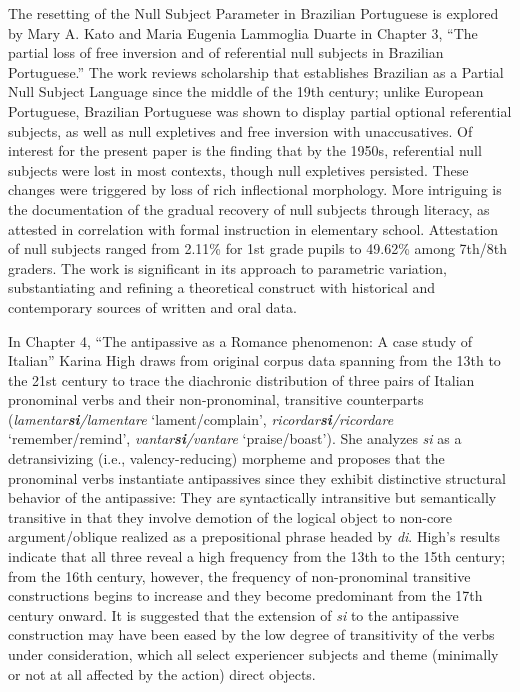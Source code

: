 \documentclass[output=paper,draftmode]{langscibook}
\begin{document}
The resetting of the Null Subject Parameter in Brazilian Portuguese is explored by Mary A. Kato and Maria Eugenia Lammoglia Duarte in Chapter 3, “The partial loss of free inversion and of referential null subjects in Brazilian Portuguese.” The work reviews scholarship that establishes Brazilian as a Partial Null Subject Language since the middle of the 19th century; unlike European Portuguese, Brazilian Portuguese was shown to display partial optional referential subjects, as well as null expletives and free inversion with unaccusatives. Of interest for the present paper is the finding that by the 1950s, referential null subjects were lost in most contexts, though null expletives persisted. These changes were triggered by loss of rich inflectional morphology. More intriguing is the documentation of the gradual recovery of null subjects through literacy, as attested in correlation with formal instruction in elementary school. Attestation of null subjects ranged from 2.11\% for 1st grade pupils to 49.62\% among 7th/8th graders. The work is significant in its approach to parametric variation, substantiating and refining a theoretical construct with historical and contemporary sources of written and oral data.

In Chapter 4, “The antipassive as a Romance phenomenon: A case study of Italian” Karina High draws from original corpus data spanning from the 13th to the 21st century to trace the diachronic distribution of three pairs of Italian pronominal verbs and their non-pronominal, transitive counterparts (\textit{lamentar\textbf{si}/lamentare} ‘lament/complain’, \textit{ricordar\textbf{si}/ricordare} ‘remember/remind’, \textit{vantar\textbf{si}/vantare} ‘praise/boast’). She analyzes \textit{si} as a detransivizing (i.e., valency-reducing) morpheme and proposes that the pronominal verbs instantiate antipassives since they exhibit distinctive structural behavior of the antipassive: They are syntactically intransitive but semantically transitive in that they involve demotion of the logical object to non-core argument/oblique realized as a prepositional phrase headed by \textit{di}. High’s results indicate that all three reveal a high frequency from the 13th to the 15th century; from the 16th century, however, the frequency of non-pronominal transitive constructions begins to increase and they become predominant from the 17th century onward. It is suggested that the extension of \textit{si} to the antipassive construction may have been eased by the low degree of transitivity of the verbs under consideration, which all select experiencer subjects and theme (minimally or not at all affected by the action) direct objects.
\end{document}
